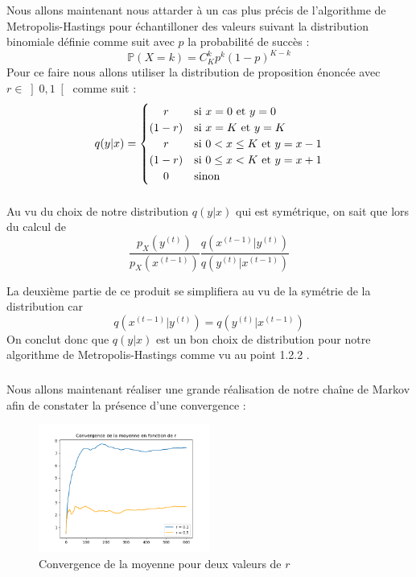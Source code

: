 Nous allons maintenant nous attarder à un cas plus précis de l'algorithme de Metropolis-Hastings pour échantilloner des valeurs suivant la 
distribution binomiale définie comme suit avec $p$ la probabilité de succès :
\begin{equation*}
  \mathbb{P}(X = k) = C_K^k p^k(1-p)^{K-k}
\end{equation*}
Pour ce faire nous allons utiliser la distribution de proposition énoncée avec \(r \in \left] 0, 1\right[\) comme suit :
\begin{equation*}
  q(y|x) = 
  \begin{cases}
    \hfil r & \text{si } x = 0 \text{ et } y = 0\\
    \hfil (1-r) &  \text{si } x = K \text{ et } y = K\\
    \hfil r & \text{si } 0 < x \leq K \text{ et } y = x - 1\\
    \hfil (1-r) & \text{si } 0 \leq x < K \text{ et } y = x + 1\\
    \hfil 0 & \text{sinon}
  \end{cases}
\end{equation*}

\subsubsection{}
Au vu du choix de notre distribution $q(y|x)$ qui est symétrique, on sait que lors du calcul de 
\begin{equation*}
  \frac{p_X(y^{(t)})}{p_X(x^{(t-1)})} \frac{q(x^{(t-1)}|y^{(t)})}{q(y^{(t)}|x^{(t-1)})}
\end{equation*}

La deuxième partie de ce produit se simplifiera au vu de la symétrie de la distribution car
\begin{equation*}
  q(x^{(t-1)}|y^{(t)}) = q(y^{(t)}|x^{(t-1)})
\end{equation*}
On conclut donc que $q(y|x)$ est un bon choix de distribution pour notre algorithme de Metropolis-Hastings comme vu au point 1.2.2 .

\subsubsection{}
\label{section:1.3.2}
Nous allons maintenant réaliser une grande réalisation de notre chaîne de Markov afin de constater la présence d'une convergence :

\begin{figure}[H]
  \centering
  \includegraphics[width=0.5\textwidth]{figs/convergence_mean.png}
  \caption{Convergence de la moyenne pour deux valeurs de $r$}
\end{figure}

